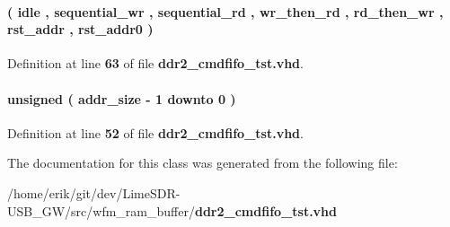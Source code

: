 \paragraph[{state\+\_\+type}]{ {\bfseries \textcolor{vhdlchar}{(}\textcolor{vhdlchar}{ }\textcolor{vhdlchar}{idle}\textcolor{vhdlchar}{ }\textcolor{vhdlchar}{,}\textcolor{vhdlchar}{ }\textcolor{vhdlchar}{sequential\+\_\+wr}\textcolor{vhdlchar}{ }\textcolor{vhdlchar}{,}\textcolor{vhdlchar}{ }\textcolor{vhdlchar}{sequential\+\_\+rd}\textcolor{vhdlchar}{ }\textcolor{vhdlchar}{,}\textcolor{vhdlchar}{ }\textcolor{vhdlchar}{wr\+\_\+then\+\_\+rd}\textcolor{vhdlchar}{ }\textcolor{vhdlchar}{,}\textcolor{vhdlchar}{ }\textcolor{vhdlchar}{rd\+\_\+then\+\_\+wr}\textcolor{vhdlchar}{ }\textcolor{vhdlchar}{,}\textcolor{vhdlchar}{ }\textcolor{vhdlchar}{rst\+\_\+addr}\textcolor{vhdlchar}{ }\textcolor{vhdlchar}{,}\textcolor{vhdlchar}{ }\textcolor{vhdlchar}{rst\+\_\+addr0}\textcolor{vhdlchar}{ }\textcolor{vhdlchar}{)}\textcolor{vhdlchar}{ }} \hspace{0.3cm}{\ttfamily [Type]}}\label{classddr2__cmd__fifo__tst_1_1arch_a4540b6a3f11eaa25ad6d045b0fb2251c}


Definition at line {\bf 63} of file {\bf ddr2\+\_\+cmdfifo\+\_\+tst.\+vhd}.

\paragraph[{waddr}]{ {\bfseries \textcolor{comment}{unsigned}\textcolor{vhdlchar}{ }\textcolor{vhdlchar}{(}\textcolor{vhdlchar}{ }\textcolor{vhdlchar}{ }\textcolor{vhdlchar}{ }\textcolor{vhdlchar}{ }{\bfseries {\bf addr\+\_\+size}} \textcolor{vhdlchar}{-\/}\textcolor{vhdlchar}{ } \textcolor{vhdldigit}{1} \textcolor{vhdlchar}{ }\textcolor{keywordflow}{downto}\textcolor{vhdlchar}{ }\textcolor{vhdlchar}{ } \textcolor{vhdldigit}{0} \textcolor{vhdlchar}{ }\textcolor{vhdlchar}{)}\textcolor{vhdlchar}{ }} \hspace{0.3cm}{\ttfamily [Signal]}}\label{classddr2__cmd__fifo__tst_1_1arch_a6ba1b3c99b1c9b107d414fde5407a8e8}


Definition at line {\bf 52} of file {\bf ddr2\+\_\+cmdfifo\+\_\+tst.\+vhd}.



The documentation for this class was generated from the following file\+:\begin{DoxyCompactItemize}
\item 
/home/erik/git/dev/\+Lime\+S\+D\+R-\/\+U\+S\+B\+\_\+\+G\+W/src/wfm\+\_\+ram\+\_\+buffer/{\bf ddr2\+\_\+cmdfifo\+\_\+tst.\+vhd}\end{DoxyCompactItemize}
